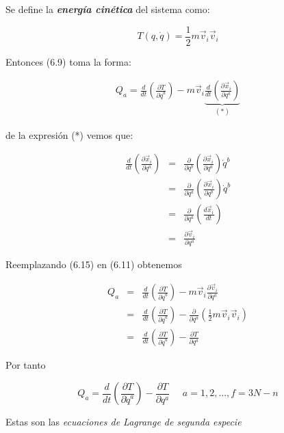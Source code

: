 \documentclass[12pt]{report}
\begin{document}
Se define la \textbf{\textit{energía cinética}} del sistema como:

\begin{equation}
T(q,\dot{q}) = \frac{1}{2}m\vec{v}_i \vec{v}_i 
\end{equation}

Entonces (6.9) toma la forma:

\begin{eqnarray}
Q_a = \frac{d}{dt} \left( \frac{\partial T}{\partial \dot{q}^a} \right) -  m\vec{v}_i \underbrace{\frac{d}{dt} \left( \frac{\partial \vec{x}_i}{\partial q^a} \right)}_{(*)}
\end{eqnarray}

de la expresión (*) vemos que:

\begin{eqnarray}
\frac{d}{dt} \left( \frac{\partial \vec{x}_i}{\partial q^a} \right) &=& \frac{\partial}{\partial q^b} \left( \frac{\partial \vec{x}_i}{\partial q^a} \right) \dot{q}^b \\
&=& \frac{\partial}{\partial q^a} \left( \frac{\partial \vec{x}_i}{\partial q^b} \right) \dot{q}^b \\
&=&\frac{\partial}{ \partial q^a} \left( \frac{d\vec{x}_i}{dt} \right) \\
&=&\frac{\partial \vec{v}_i}{\partial q^a}
\end{eqnarray}


Reemplazando (6.15) en (6.11) obtenemos

\begin{eqnarray}
Q_a &=& \frac{d}{dt} \left( \frac{\partial T}{\partial \dot{q}^a} \right) -  m\vec{v}_i \frac{\partial \vec{v}_i}{\partial q^a} \\
&=& \frac{d}{dt} \left( \frac{\partial T}{\partial \dot{q}^a} \right) - \frac{\partial}{\partial q^a} \left(\frac{1}{2} m\vec{v}_i \vec{v}_i \right) \\
&=&\frac{d}{dt} \left( \frac{\partial T}{\partial \dot{q}^a} \right) - \frac{\partial T}{\partial q^a} 
\end{eqnarray}

Por tanto


\begin{equation}
Q_a=\frac{d}{dt} \left( \frac{\partial T}{\partial \dot{q}^a} \right) - \frac{\partial T}{\partial q^a}  \ \ \ \ \ \ a=1,2,...,f=3N-n
\end{equation}

Estas son las \textit{ecuaciones de Lagrange de segunda especie} \\ \\
\end{document}
